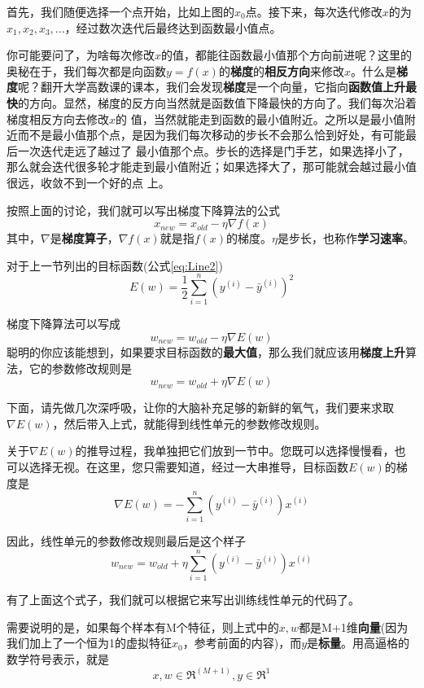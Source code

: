 首先，我们随便选择一个点开始，比如上图的\(x_0\)点。接下来，每次迭代修改\(x\)的为\(x_1,x_2,x_3,...\)，经过数次迭代后最终达到函数最小值点。

你可能要问了，为啥每次修改\(x\)的值，都能往函数最小值那个方向前进呢？这里的奥秘在于，我们每次都是向函数\(y=f(x)\)的\textbf{梯度}的\textbf{相反方向}来修改\(x\)。什么是\textbf{梯度}呢？翻开大学高数课的课本，我们会发现\textbf{梯度}是一个向量，它指向\textbf{函数值上升最快}的方向。显然，梯度的反方向当然就是函数值下降最快的方向了。我们每次沿着梯度相反方向去修改\(x\)的
值，当然就能走到函数的最小值附近。之所以是最小值附近而不是最小值那个点，是因为我们每次移动的步长不会那么恰到好处，有可能最后一次迭代走远了越过了
最小值那个点。步长的选择是门手艺，如果选择小了，那么就会迭代很多轮才能走到最小值附近；如果选择大了，那可能就会越过最小值很远，收敛不到一个好的点
上。

按照上面的讨论，我们就可以写出梯度下降算法的公式
\[
	{x}_{new}={x}_{old}-\eta\nabla{f(x)}
\]
其中，\(\nabla\)是\textbf{梯度算子}，\(\nabla{f(x)}\)就是指{}\(f(x)\)的梯度。\(\eta\)是步长，也称作\textbf{学习速率}。

对于上一节列出的目标函数(公式\ref{eq:Line2})
\[
	E({w})=\frac{1}{2}\sum_{i=1}^{n}({y^{(i)}-\bar{y}^{(i)}})^2
\]

梯度下降算法可以写成
\[
	{w}_{new}={w}_{old}-\eta\nabla{E({w})}
\]
聪明的你应该能想到，如果要求目标函数的\textbf{最大值}，那么我们就应该用\textbf{梯度上升}算法，它的参数修改规则是
\[
	{w}_{new}={w}_{old}+\eta\nabla{E({w})}
\]

下面，请先做几次深呼吸，让你的大脑补充足够的新鲜的氧气，我们要来求取\(\nabla{E}({w})\)，然后带入上式，就能得到线性单元的参数修改规则。

关于\(\nabla{E({w})}\)的推导过程，我单独把它们放到一节中。您既可以选择慢慢看，也可以选择无视。在这里，您只需要知道，经过一大串推导，目标函数\(E(w)\)的梯度是
\[
	\nabla{E({w})}=-\sum_{i=1}^{n}(y^{(i)}-\bar{y}^{(i)}){x}^{(i)}
\]

因此，线性单元的参数修改规则最后是这个样子
\begin{equation}
	{w}_{new}={w}_{old}+\eta\sum_{i=1}^{n}(y^{(i)}-\bar{y}^{(i)}){x}^{(i)}
	\label{eq:Line3}
\end{equation}


有了上面这个式子，我们就可以根据它来写出训练线性单元的代码了。

需要说明的是，如果每个样本有M个特征，则上式中的\({x},{w}\)都是M+1维\textbf{向量}(因为我们加上了一个恒为1的虚拟特征\(x_0\)，参考前面的内容)，而\(y\)是\textbf{标量}。用高逼格的数学符号表示，就是
\[
	{x},{w}\in\Re^{(M+1)},
	y\in\Re^1
\]

